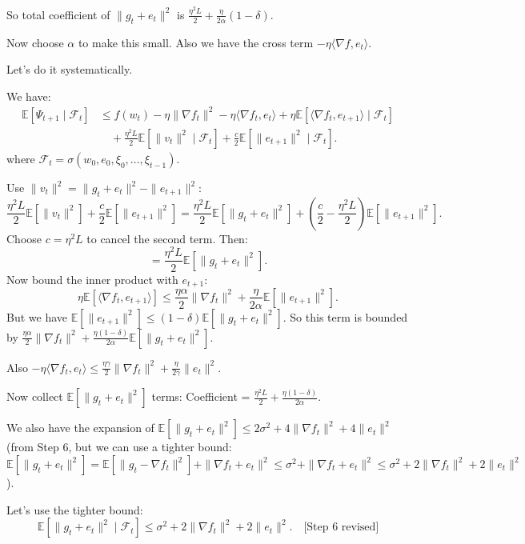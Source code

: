 \documentclass{article}
\begin{document}
So total coefficient of $\|g_t+e_t\|^2$ is $\frac{\eta^2 L}{2} + \frac{\eta}{2\alpha}(1-\delta)$.

Now choose $\alpha$ to make this small. Also we have the cross term $-\eta \langle \nabla f, e_t \rangle$.

Let's do it systematically.

We have:
\begin{align*}
\mathbb{E}[\Psi_{t+1} \mid \mathcal{F}_t] 
&\le f(w_t) - \eta \|\nabla f_t\|^2 - \eta \langle \nabla f_t, e_t \rangle + \eta \mathbb{E}[\langle \nabla f_t, e_{t+1} \rangle \mid \mathcal{F}_t] \\
&\quad + \frac{\eta^2 L}{2} \mathbb{E}[\|v_t\|^2 \mid \mathcal{F}_t] + \frac{c}{2} \mathbb{E}[\|e_{t+1}\|^2 \mid \mathcal{F}_t].
\end{align*}
where $\mathcal{F}_t = \sigma(w_0, e_0, \xi_0, \dots, \xi_{t-1})$.

Use $\|v_t\|^2 = \|g_t+e_t\|^2 - \|e_{t+1}\|^2$:
\[
\frac{\eta^2 L}{2} \mathbb{E}[\|v_t\|^2] + \frac{c}{2} \mathbb{E}[\|e_{t+1}\|^2] = \frac{\eta^2 L}{2} \mathbb{E}[\|g_t+e_t\|^2] + \left(\frac{c}{2} - \frac{\eta^2 L}{2}\right) \mathbb{E}[\|e_{t+1}\|^2].
\]
Choose $c = \eta^2 L$ to cancel the second term. Then:
\[
= \frac{\eta^2 L}{2} \mathbb{E}[\|g_t+e_t\|^2].
\]
Now bound the inner product with $e_{t+1}$:
\[
\eta \mathbb{E}[\langle \nabla f_t, e_{t+1} \rangle] \le \frac{\eta \alpha}{2} \|\nabla f_t\|^2 + \frac{\eta}{2\alpha} \mathbb{E}[\|e_{t+1}\|^2].
\]
But we have $\mathbb{E}[\|e_{t+1}\|^2] \le (1-\delta) \mathbb{E}[\|g_t+e_t\|^2]$. So this term is bounded by $\frac{\eta \alpha}{2} \|\nabla f_t\|^2 + \frac{\eta(1-\delta)}{2\alpha} \mathbb{E}[\|g_t+e_t\|^2]$.

Also $-\eta \langle \nabla f_t, e_t \rangle \le \frac{\eta \gamma}{2} \|\nabla f_t\|^2 + \frac{\eta}{2\gamma} \|e_t\|^2$.

Now collect $\mathbb{E}[\|g_t+e_t\|^2]$ terms:
Coefficient = $\frac{\eta^2 L}{2} + \frac{\eta(1-\delta)}{2\alpha}$.

We also have the expansion of $\mathbb{E}[\|g_t+e_t\|^2] \le 2\sigma^2 + 4\|\nabla f_t\|^2 + 4\|e_t\|^2$ (from Step 6, but we can use a tighter bound: $\mathbb{E}[\|g_t+e_t\|^2] = \mathbb{E}[\|g_t - \nabla f_t\|^2] + \|\nabla f_t + e_t\|^2 \le \sigma^2 + \|\nabla f_t + e_t\|^2 \le \sigma^2 + 2\|\nabla f_t\|^2 + 2\|e_t\|^2$).

Let's use the tighter bound:
\[
\mathbb{E}[\|g_t+e_t\|^2 \mid \mathcal{F}_t] \le \sigma^2 + 2\|\nabla f_t\|^2 + 2\|e_t\|^2. \quad \text{[Step 6 revised]}
\]
\end{document}
